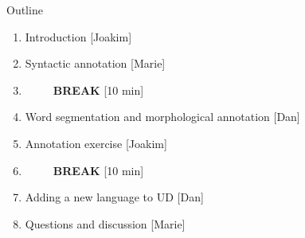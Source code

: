 \documentclass[10pt, compress, aspectratio=169]{beamer}
\begin{document}
\begin{frame}{Outline}
\begin{enumerate}
\item Introduction [Joakim]
\item Syntactic annotation [Marie]
\item []~~~~~\textbf{BREAK} [10 min]
\item Word segmentation and morphological annotation [Dan]
\item Annotation exercise [Joakim]
\item []~~~~~\textbf{BREAK} [10 min]
\item Adding a new language to UD [Dan]
\item Questions and discussion [Marie]
\end{enumerate}
\end{frame}
\end{document}
